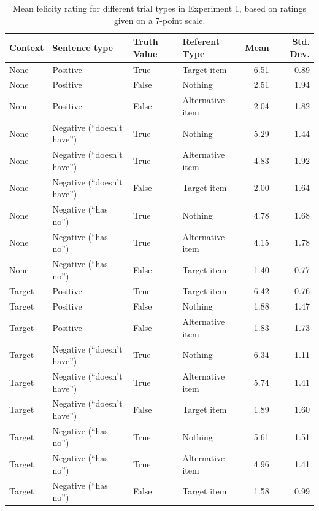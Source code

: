 \documentclass[man, noapacite]{apa2}
\begin{document}
\begin{table}[h!]
\caption{\label{tab:m1} Mean felicity rating for different trial types in Experiment 1, based on ratings given on a 7-point scale.}
\begin{center}
\small\addtolength{\tabcolsep}{-5pt}
\begin{tabular}{llllrr}
 \hline
 Context & Sentence type & Truth Value & Referent Type & Mean & Std. Dev. \\
 \hline
 None & Positive & True & Target item & 6.51 & 0.89\\
 None & Positive & False & Nothing & 2.51 & 1.94\\
 None & Positive & False & Alternative item & 2.04 & 1.82\\
 None & Negative (``doesn't have'') & True & Nothing & 5.29 & 1.44\\
 None & Negative (``doesn't have'') & True & Alternative item & 4.83 & 1.92\\
 None & Negative (``doesn't have'') & False & Target item & 2.00 & 1.64\\
 None & Negative (``has no'') & True & Nothing & 4.78 & 1.68\\
 None & Negative (``has no'') & True & Alternative item & 4.15 & 1.78\\
 None & Negative (``has no'') & False & Target item & 1.40 & 0.77\\
 Target & Positive & True & Target item & 6.42 & 0.76\\
 Target& Positive & False & Nothing & 1.88 & 1.47\\
 Target & Positive & False & Alternative item & 1.83 & 1.73\\
 Target & Negative (``doesn't have'') & True & Nothing & 6.34 & 1.11\\
 Target & Negative (``doesn't have'') & True & Alternative item & 5.74 & 1.41\\
 Target & Negative (``doesn't have'') & False & Target item & 1.89 & 1.60\\
 Target & Negative (``has no'') & True & Nothing & 5.61 & 1.51\\
 Target & Negative (``has no'') & True & Alternative item & 4.96 & 1.41\\
 Target & Negative (``has no'') & False & Target item & 1.58 & 0.99\\
 \hline
\end{tabular}
\end{center}
\end{table}
\end{document}
